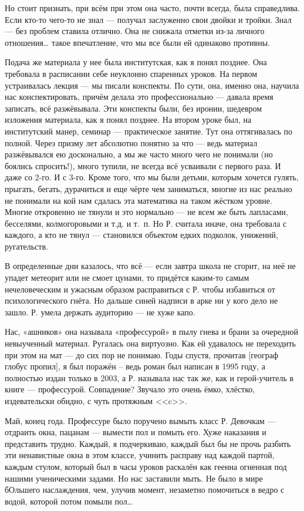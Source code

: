 Но стоит признать, при всём при этом она часто, почти всегда, была справедлива. Если кто-то чего-то не знал — получал заслуженно свои двойки и тройки. Знал — без проблем ставила отлично. Она не снижала отметки из-за личного отношения… такое впечатление, что мы все были ей одинаково противны. 

Подача же материала у нее была институтская, как я понял позднее. Она требовала в расписании себе неуклонно спаренных уроков. На первом устраивалась лекция — мы писали конспекты. По сути, она, именно она, научила нас конспектировать, причём делала это профессионально — давала время записать, всё разжёвывала. Эти конспекты были, без иронии, шедевром изложения материала, как я понял позднее. На втором уроке был, на институтский манер, семинар — практическое занятие. Тут она оттягивалась по полной. Через призму лет абсолютно понятно за что — ведь материал разжёвывался ею досконально, а мы же часто много чего не понимали (но боялись спросить!), много тупили, не всегда всё усваивали с  первого раза. И даже со 2-го. И с 3-го. Кроме того, что мы были детьми, которым хочется гулять, прыгать, бегать, дурачиться и еще чёрте чем заниматься, многие из нас реально не понимали на кой нам сдалась эта математика на таком жёстком уровне. Многие откровенно не тянули и это нормально — не всем же быть лапласами, бесселями, колмогоровыми и т.д. и т. п. Но Р. считала иначе, она требовала с каждого, а кто не тянул — становился объектом едких подколок, унижений, ругательств.

В определенные дни казалось, что всё — если завтра школа не сгорит, на неё не упадет метеорит или не смоет цунами, то придётся каким-то самым нечеловеческим и ужасным образом расправиться с Р. чтобы избавиться от психологического гнёта. Но дальше синей надписи в арке ни у кого дело не зашло. Р. умела держать аудиторию — не хуже капо.

Нас, «ашников» она называла «профессурой» в пылу гнева и брани за очередной невыученный материал. Ругалась она виртуозно. Как ей удавалось не переходить при этом на мат — до сих пор не понимаю. Годы спустя, прочитав [географ глобус пропил], я был поражён – ведь роман был написан в 1995 году, а полностью издан только в 2003, а Р. называла нас так же, как и герой-учитель в книге — профессурой. Совпадение? Звучало это очень ёмко, хлёстко, издевательски обидно, с чуть протяжным <<c>>.

Май, конец года. Профессуре было поручено вымыть класс Р. Девочкам — отдраить окна, пацанам — вымести пол и помыть его. Хуже наказания и представить трудно. Каждый, я подчеркиваю, каждый был бы не прочь разбить эти ненавистные окна в этом классе, учинить расправу над каждой партой, каждым стулом, который был в часы уроков раскалён как геенна огненная под нашими ученическими задами. Но нас заставили мыть. Не было в мире бОльшего наслаждения, чем, улучив момент, незаметно помочиться в ведро с водой, которой потом помыли пол…

